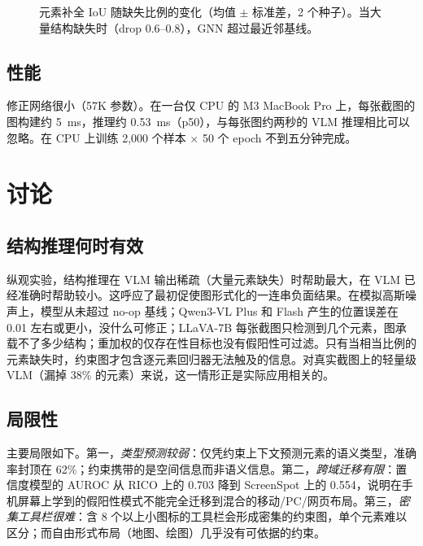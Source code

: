 \documentclass[11pt, letterpaper]{ctexart}
\begin{document}
\begin{figure}[htbp]
\caption{元素补全 IoU 随缺失比例的变化（均值 $\pm$ 标准差，2 个种子）。当大量结构缺失时（drop 0.6--0.8），GNN 超过最近邻基线。}
\label{fig:completion}
\end{figure}

\subsection{性能}
修正网络很小（57K 参数）。在一台仅 CPU 的 M3 MacBook Pro 上，每张截图的图构建约 5~ms，推理约 0.53~ms（p50），与每张图约两秒的 VLM 推理相比可以忽略。在 CPU 上训练 2,000 个样本 $\times$ 50 个 epoch 不到五分钟完成。

\section{讨论}
\subsection{结构推理何时有效}
纵观实验，结构推理在 VLM 输出稀疏（大量元素缺失）时帮助最大，在 VLM 已经准确时帮助较小。这呼应了最初促使图形式化的一连串负面结果。在模拟高斯噪声上，模型从未超过 no-op 基线；Qwen3-VL Plus 和 Flash 产生的位置误差在 0.01 左右或更小，没什么可修正；LLaVA-7B 每张截图只检测到几个元素，图承载不了多少结构；重加权的仅存在性目标也没有假阳性可过滤。只有当相当比例的元素缺失时，约束图才包含逐元素回归器无法触及的信息。对真实截图上的轻量级 VLM（漏掉 38\% 的元素）来说，这一情形正是实际应用相关的。

\subsection{局限性}
主要局限如下。第一，\emph{类型预测较弱}：仅凭约束上下文预测元素的语义类型，准确率封顶在 62\%；约束携带的是空间信息而非语义信息。第二，\emph{跨域迁移有限}：置信度模型的 AUROC 从 RICO 上的 0.703 降到 ScreenSpot 上的 0.554，说明在手机屏幕上学到的假阳性模式不能完全迁移到混合的移动/PC/网页布局。第三，\emph{密集工具栏很难}：含 8 个以上小图标的工具栏会形成密集的约束图，单个元素难以区分；而自由形式布局（地图、绘图）几乎没有可依据的约束。
\end{document}
